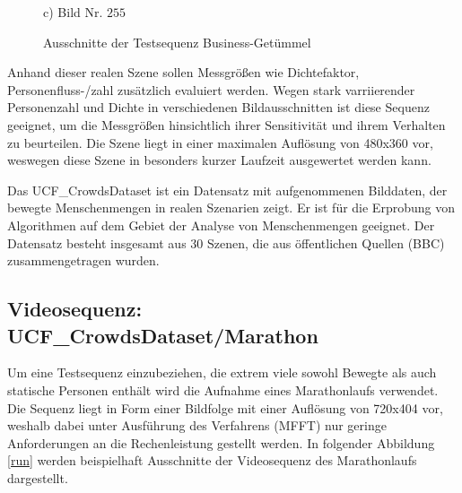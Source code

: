 \begin{figure}[H]
\begin{minipage}{0.3\textwidth}
    c) Bild Nr. $255$
  \end{minipage}
\caption{Ausschnitte der Testsequenz Business-Getümmel \cite{AliS07}}
\label{business}
\end{figure}

Anhand dieser realen Szene sollen Messgrößen wie Dichtefaktor, Personenfluss-/zahl zusätzlich evaluiert werden. Wegen stark varriierender Personenzahl und Dichte in verschiedenen Bildausschnitten ist diese Sequenz geeignet, um die Messgrößen hinsichtlich ihrer Sensitivität und ihrem Verhalten zu beurteilen. Die Szene liegt in einer maximalen Auflösung von 480x360 vor, weswegen diese Szene in besonders kurzer Laufzeit ausgewertet werden kann.

Das UCF\_CrowdsDataset ist ein Datensatz mit aufgenommenen Bilddaten, der bewegte Menschenmengen in realen Szenarien zeigt. Er ist für die Erprobung von Algorithmen auf dem Gebiet der Analyse von Menschenmengen geeignet. Der Datensatz besteht insgesamt aus 30 Szenen, die aus öffentlichen Quellen (\zb BBC) zusammengetragen wurden.

\subsection{Videosequenz: UCF\_CrowdsDataset/Marathon \cite{AliS07}}
Um eine Testsequenz einzubeziehen, die extrem viele sowohl Bewegte als auch statische Personen enthält wird die Aufnahme eines Marathonlaufs verwendet. Die Sequenz liegt in Form einer Bildfolge mit einer Auflösung von 720x404 vor, weshalb dabei unter Ausführung des Verfahrens (MFFT) nur geringe Anforderungen an die Rechenleistung gestellt werden. In folgender Abbildung \ref{run} werden beispielhaft Ausschnitte der Videosequenz des Marathonlaufs dargestellt.

